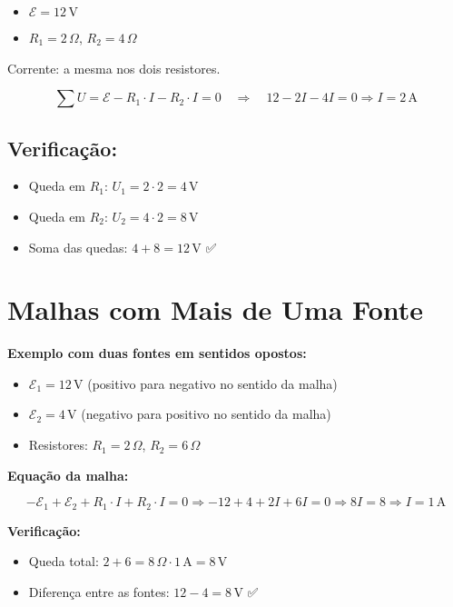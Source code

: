 \begin{itemize}
    \item $\mathcal{E} = 12\,\text{V}$
    \item $R_1 = 2\,\Omega$, $R_2 = 4\,\Omega$
\end{itemize}

Corrente: a mesma nos dois resistores.

\[
\sum U = \mathcal{E} - R_1 \cdot I - R_2 \cdot I = 0
\quad \Rightarrow \quad
12 - 2I - 4I = 0
\Rightarrow I = 2\,\text{A}
\]

\subsection{Verificação:}
\begin{itemize}
    \item Queda em $R_1$: $U_1 = 2 \cdot 2 = 4\,\text{V}$
    \item Queda em $R_2$: $U_2 = 4 \cdot 2 = 8\,\text{V}$
    \item Soma das quedas: $4 + 8 = 12\,\text{V}$ ✅
\end{itemize}

\section{Malhas com Mais de Uma Fonte}
\textbf{Exemplo com duas fontes em sentidos opostos:}

\begin{itemize}
    \item $\mathcal{E}_1 = 12\,\text{V}$ (positivo para negativo no sentido da malha)
    \item $\mathcal{E}_2 = 4\,\text{V}$ (negativo para positivo no sentido da malha)
    \item Resistores: $R_1 = 2\,\Omega$, $R_2 = 6\,\Omega$
\end{itemize}

\textbf{Equação da malha:}

\[
-\mathcal{E}_1 + \mathcal{E}_2 + R_1 \cdot I + R_2 \cdot I = 0
\Rightarrow -12 + 4 + 2I + 6I = 0
\Rightarrow 8I = 8 \Rightarrow I = 1\,\text{A}
\]

\textbf{Verificação:}
\begin{itemize}
    \item Queda total: $2 + 6 = 8\,\Omega \cdot 1\,\text{A} = 8\,\text{V}$
    \item Diferença entre as fontes: $12 - 4 = 8\,\text{V}$ ✅
\end{itemize}

